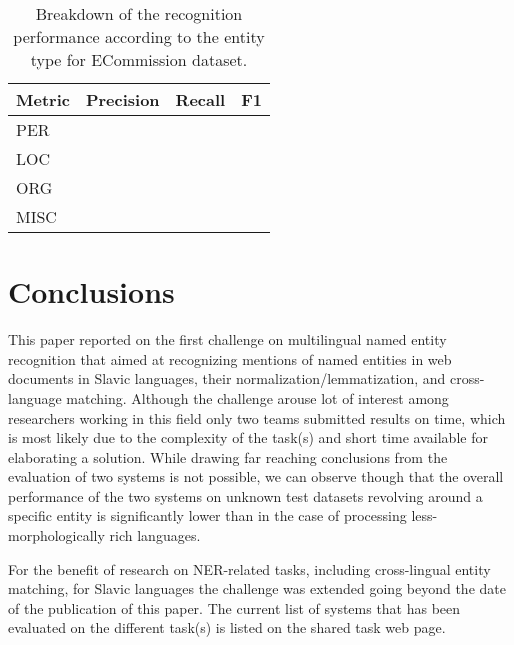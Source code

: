 \documentclass[11pt]{article}
\begin{document}
\begin{table}
  \begin{center}
    \begin{footnotesize}
      \begin{tabular}{lccc}
        \toprule 
        Metric & \textbf{Precision} & \textbf{Recall} & \textbf{F1} \\
        \midrule
        PER &  &  & \\
        LOC &  & & \\
        ORG &  &  & \\
        MISC & &  &\\
        \bottomrule
      \end{tabular}
    \end{footnotesize}
  \end{center}
  \caption{Breakdown of the recognition performance according to the entity type for {\sc ECommission} dataset.}
  \label{tab:recognition-breakdown-ec}
\end{table}

\section{Conclusions}
\label{sec:conclusions}


This paper reported on the first challenge on multilingual named entity recognition that aimed at recognizing 
mentions of named entities in web documents in Slavic languages, their normalization/lemmatization, and 
cross-language matching. Although the challenge arouse lot of interest among researchers working 
in this field only two teams submitted results on time, which is most likely due to the complexity
of the task(s) and short time available for elaborating a solution. While drawing far reaching
conclusions from the evaluation of two systems is not possible, we can observe though that 
the overall performance of the two systems on unknown test datasets revolving around a specific entity
is significantly lower than in the case of processing less-morphologically rich languages. 

For the benefit of research on NER-related tasks, including cross-lingual entity matching, for Slavic
languages the challenge was extended going beyond the date of the publication of this paper. The current 
list of systems that has been evaluated on the different task(s) is listed on the shared task web page. 
\end{document}
